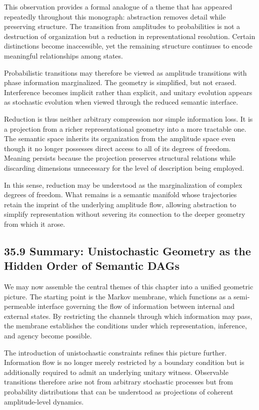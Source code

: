 \documentclass[12pt,letterpaper]{article}
\theoremstyle{remark}
\begin{document}
This observation provides a formal analogue of a theme that has appeared repeatedly throughout this monograph: abstraction removes detail while preserving structure. The transition from amplitudes to probabilities is not a destruction of organization but a reduction in representational resolution. Certain distinctions become inaccessible, yet the remaining structure continues to encode meaningful relationships among states.

Probabilistic transitions may therefore be viewed as amplitude transitions with phase information marginalized. The geometry is simplified, but not erased. Interference becomes implicit rather than explicit, and unitary evolution appears as stochastic evolution when viewed through the reduced semantic interface.

Reduction is thus neither arbitrary compression nor simple information loss. It is a projection from a richer representational geometry into a more tractable one. The semantic space inherits its organization from the amplitude space even though it no longer possesses direct access to all of its degrees of freedom. Meaning persists because the projection preserves structural relations while discarding dimensions unnecessary for the level of description being employed.

In this sense, reduction may be understood as the marginalization of complex degrees of freedom. What remains is a semantic manifold whose trajectories retain the imprint of the underlying amplitude flow, allowing abstraction to simplify representation without severing its connection to the deeper geometry from which it arose.

\subsection{35.9 Summary: Unistochastic Geometry as the Hidden Order of Semantic DAGs}

We may now assemble the central themes of this chapter into a unified geometric picture. The starting point is the Markov membrane, which functions as a semi-permeable interface governing the flow of information between internal and external states. By restricting the channels through which information may pass, the membrane establishes the conditions under which representation, inference, and agency become possible.

The introduction of unistochastic constraints refines this picture further. Information flow is no longer merely restricted by a boundary condition but is additionally required to admit an underlying unitary witness. Observable transitions therefore arise not from arbitrary stochastic processes but from probability distributions that can be understood as projections of coherent amplitude-level dynamics.
\end{document}
